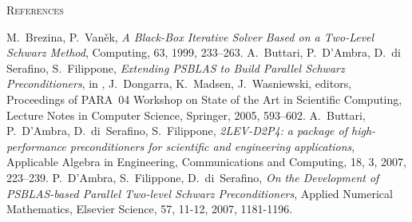 \begin{thebibliography}{99}
         {\textsc{References}}


%
%
M.~Brezina, P.~Van{\v e}k,
{\em A Black-Box Iterative Solver Based on a Two-Level Schwarz Method},
Computing, 63, 1999, 233--263.
%
A.~Buttari, P.~D'Ambra, D.~di Serafino, S.~Filippone,
{\em Extending PSBLAS to Build Parallel Schwarz Preconditioners},
in , J.~Dongarra, K.~Madsen, J.~Wasniewski, editors,
Proceedings of PARA~04 Workshop on State of the Art
in Scientific Computing, Lecture Notes in Computer Science,
Springer, 2005, 593--602.
%
A.~Buttari, P.~D'Ambra, D.~di~Serafino, S.~Filippone,
{\em 2LEV-D2P4: a package of high-performance preconditioners
for scientific and engineering applications},
Applicable Algebra in Engineering, Communications and Computing, 
18, 3, 2007, 223--239.
%
  P.~D'Ambra, S.~Filippone,  D.~di~Serafino,
{\em On the Development of PSBLAS-based Parallel Two-level Schwarz Preconditioners},
Applied Numerical Mathematics, Elsevier Science, 
57, 11-12, 2007, 1181-1196.


\end{thebibliography}
